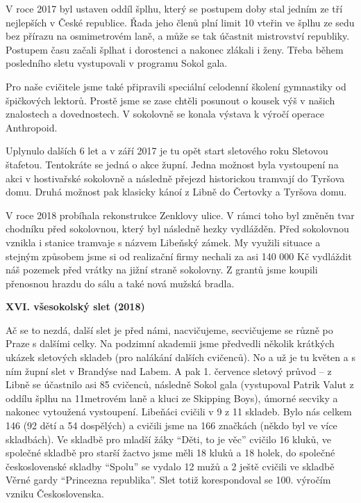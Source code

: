 V roce 2017 byl ustaven oddíl šplhu, který se postupem doby stal jedním
ze tří nejlepších v České republice. Řada jeho členů plní limit 10
vteřin ve šplhu ze sedu bez přírazu na osmimetrovém laně, a může se tak
účastnit mistrovství republiky. Postupem času začali šplhat i dorostenci
a nakonec zlákali i ženy. Třeba během posledního sletu vystupovali v
programu Sokol gala.

Pro naše cvičitele jsme také připravili speciální celodenní školení
gymnastiky od špičkových lektorů. Prostě jsme se zase chtěli posunout o
kousek výš v našich znalostech a dovednostech. V sokolovně se konala
výstava k výročí operace Anthropoid.

Uplynulo dalších 6 let a v září 2017 je tu opět start sletového roku
Sletovou štafetou. Tentokráte se jedná o akce župní. Jedna možnost byla
vystoupení na akci v hostivařské sokolovně a následně přejezd
historickou tramvají do Tyršova domu. Druhá možnost pak klasicky kánoí z
Libně do Čertovky a Tyršova domu.

V roce 2018 probíhala rekonstrukce Zenklovy ulice. V rámci toho byl
změněn tvar chodníku před sokolovnou, který byl následně hezky
vydlážděn. Před sokolovnou vznikla i stanice tramvaje s názvem Libeňský
zámek. My využili situace a stejným způsobem jsme si od realizační firmy
nechali za asi 140 000 Kč vydláždit náš pozemek před vrátky na jižní
straně sokolovny. Z grantů jsme koupili přenosnou hrazdu do sálu a také
nová mužská bradla.

\textbf{XVI. všesokolský slet (2018)}

Ač se to nezdá, další slet je před námi, nacvičujeme, secvičujeme se
různě po Praze s dalšími celky. Na podzimní akademii jsme předvedli
několik krátkých ukázek sletových skladeb (pro nalákání dalších
cvičenců). No a už je tu květen a s ním župní slet v Brandýse nad Labem.
A pak 1. července sletový průvod -- z Libně se účastnilo asi 85
cvičenců, následně Sokol gala (vystupoval Patrik Valut z oddílu šplhu na
11metrovém laně a kluci ze Skipping Boys), úmorné secviky a nakonec
vytoužená vystoupení. Libeňáci cvičili v 9 z 11 skladeb. Bylo nás celkem
146 (92 dětí a 54 dospělých) a cvičili jsme na 166 značkách (někdo byl
ve více skladbách). Ve skladbě pro mladší žáky ``Děti, to je věc''
cvičilo 16 kluků, ve společné skladbě pro starší žactvo jsme měli 18
kluků a 18 holek, do společné československé skladby ``Spolu'' se vydalo
12 mužů a 2 ještě cvičili ve skladbě Věrné gardy ``Princezna
republika''. Slet totiž korespondoval se 100. výročím vzniku
Československa.

